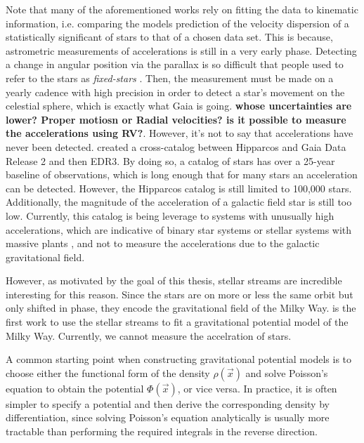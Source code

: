         Note that many of the aforementioned works rely on fitting the data to kinematic information, i.e. comparing the models prediction of the velocity dispersion of a statistically significant of stars to that of a chosen data set. This is because, astrometric measurements of accelerations is still in a very early phase. Detecting a change in angular position via the parallax is so difficult that people used to refer to the stars as \textit{fixed-stars} \citep{1981unht.book.....K}. Then, the measurement must be made on a yearly cadence with high precision in order to detect a star's movement on the celestial sphere, which is exactly what Gaia is going. \textbf{whose uncertainties are lower? Proper motiosn or Radial velocities? is it possible to measure the accelerations using RV?}. However, it's not to say that accelerations have never been detected. \citet{2018ApJS..239...31B,2021ApJS..254...42B} created a cross-catalog between Hipparcos and Gaia Data Release 2 \citep{2018A&A...616A...1G} and then EDR3. By doing so, a catalog of stars has over a 25-year baseline of observations, which is long enough that for many stars an acceleration can be detected. However, the Hipparcos catalog is still limited to 100,000 stars. Additionally, the magnitude of the acceleration of a galactic field star is still too low. Currently, this catalog is being leverage to systems with unusually high accelerations, which are indicative of binary star systems or stellar systems with massive plants \citep{2023MNRAS.521.5232W,2025AJ....170...52G}, and not to measure the accelerations due to the galactic gravitational field. 

        However, as motivated by the goal of this thesis, stellar streams are incredible interesting for this reason. Since the stars are on more or less the same orbit but only shifted in phase, they encode the gravitational field of the Milky Way. \citet{2024ApJ...967...89I} is the first work to use the stellar streams to fit a gravitational potential model of the Milky Way. Currently, we cannot measure the accelration of stars. 

        A common starting point when constructing gravitational potential models is to choose either the functional form of the density $\rho(\vec{x})$ and solve Poisson's equation to obtain the potential $\Phi(\vec{x})$, or vice versa. In practice, it is often simpler to specify a potential and then derive the corresponding density by differentiation, since solving Poisson's equation analytically is usually more tractable than performing the required integrals in the reverse direction.


